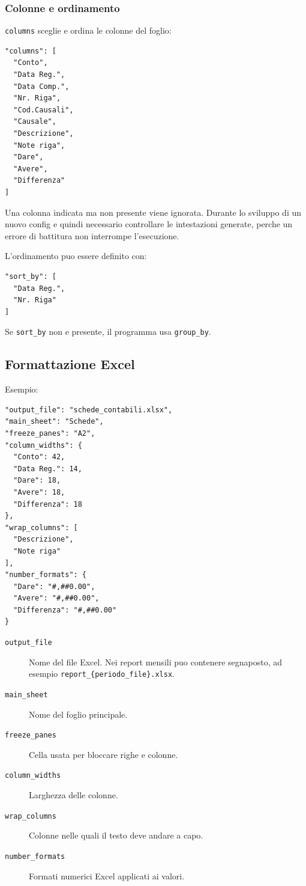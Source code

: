 \subsubsection{Colonne e ordinamento}

\texttt{columns} sceglie e ordina le colonne del foglio:

\begin{lstlisting}
"columns": [
  "Conto",
  "Data Reg.",
  "Data Comp.",
  "Nr. Riga",
  "Cod.Causali",
  "Causale",
  "Descrizione",
  "Note riga",
  "Dare",
  "Avere",
  "Differenza"
]
\end{lstlisting}

Una colonna indicata ma non presente viene ignorata. Durante lo sviluppo di
un nuovo config e quindi necessario controllare le intestazioni generate,
perche un errore di battitura non interrompe l'esecuzione.

L'ordinamento puo essere definito con:

\begin{lstlisting}
"sort_by": [
  "Data Reg.",
  "Nr. Riga"
]
\end{lstlisting}

Se \texttt{sort\_by} non e presente, il programma usa \texttt{group\_by}.

\subsection{Formattazione Excel}

Esempio:

\begin{lstlisting}
"output_file": "schede_contabili.xlsx",
"main_sheet": "Schede",
"freeze_panes": "A2",
"column_widths": {
  "Conto": 42,
  "Data Reg.": 14,
  "Dare": 18,
  "Avere": 18,
  "Differenza": 18
},
"wrap_columns": [
  "Descrizione",
  "Note riga"
],
"number_formats": {
  "Dare": "#,##0.00",
  "Avere": "#,##0.00",
  "Differenza": "#,##0.00"
}
\end{lstlisting}

\begin{description}
  \item[\texttt{output\_file}]
  Nome del file Excel. Nei report mensili puo contenere segnaposto, ad
  esempio \texttt{report\_\{periodo\_file\}.xlsx}.

  \item[\texttt{main\_sheet}]
  Nome del foglio principale.

  \item[\texttt{freeze\_panes}]
  Cella usata per bloccare righe e colonne.

  \item[\texttt{column\_widths}]
  Larghezza delle colonne.

  \item[\texttt{wrap\_columns}]
  Colonne nelle quali il testo deve andare a capo.

  \item[\texttt{number\_formats}]
  Formati numerici Excel applicati ai valori.
\end{description}

